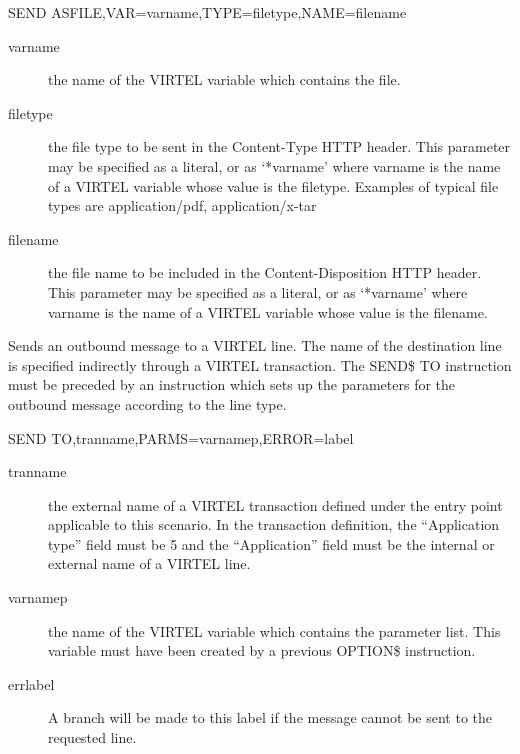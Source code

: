 \documentclass[letterpaper,10pt,english]{sphinxmanual}
\begin{document}
\begin{sphinxVerbatim}[commandchars=\\\{\}]
SEND\PYGZdl{} AS\PYGZhy{}FILE,VAR=\PYGZsq{}varname\PYGZsq{},TYPE=\PYGZsq{}filetype\PYGZsq{},NAME=\PYGZsq{}filename\PYGZsq{}
\end{sphinxVerbatim}
\begin{description}
\item[{varname}] \leavevmode
the name of the VIRTEL variable which contains the file.

\item[{filetype}] \leavevmode
the file type to be sent in the Content-Type HTTP header. This parameter may be specified as a literal, or as ‘*varname’ where varname is the name of a VIRTEL variable whose value is the filetype. Examples of typical file types are application/pdf, application/x-tar

\item[{filename}] \leavevmode
the file name to be included in the Content-Disposition HTTP header. This parameter may be specified as a literal, or as ‘*varname’ where varname is the name of a VIRTEL variable whose value is the filename.

\end{description}


Sends an outbound message to a VIRTEL line. The name of the destination line is specified indirectly through a VIRTEL transaction. The SEND\$ TO instruction must be preceded by an {\hyperref[\detokenize{User_Guide:v457ug-option}]{}} instruction which sets up the parameters for the outbound message according to the line type.

\begin{sphinxVerbatim}[commandchars=\\\{\}]
SEND\PYGZdl{} TO,\PYGZsq{}tranname\PYGZsq{},PARMS=\PYGZsq{}varnamep\PYGZsq{},ERROR=label
\end{sphinxVerbatim}
\begin{description}
\item[{tranname}] \leavevmode
the external name of a VIRTEL transaction defined under the entry point applicable to this scenario. In the transaction definition, the “Application type” field must be 5 and the “Application” field must be the internal or external name of a VIRTEL line.

\item[{varnamep}] \leavevmode
the name of the VIRTEL variable which contains the parameter list. This variable must have been created by a previous OPTION\$ instruction.

\item[{errlabel}] \leavevmode
A branch will be made to this label if the message cannot be sent to the requested line.

\end{description}
\end{document}
